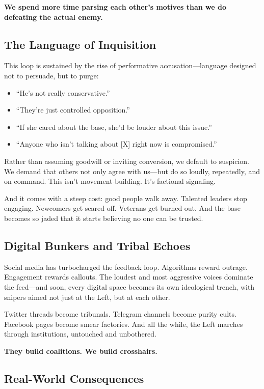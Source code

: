 \textbf{We spend more time parsing each other’s motives than we do defeating the actual enemy.}

\subsection*{The Language of Inquisition}

This loop is sustained by the rise of performative accusation—language designed not to persuade, but to purge:
\begin{itemize}
    \item ``He’s not really conservative.''
    \item ``They’re just controlled opposition.''
    \item ``If she cared about the base, she’d be louder about this issue.''
    \item ``Anyone who isn’t talking about [X] right now is compromised.''
\end{itemize}

Rather than assuming goodwill or inviting conversion, we default to suspicion. We demand that others not only agree with us—but do so loudly, repeatedly, and on command. This isn’t movement-building. It’s factional signaling.

And it comes with a steep cost: good people walk away. Talented leaders stop engaging. Newcomers get scared off. Veterans get burned out. And the base becomes so jaded that it starts believing no one can be trusted.

\subsection*{Digital Bunkers and Tribal Echoes}

Social media has turbocharged the feedback loop. Algorithms reward outrage. Engagement rewards callouts. The loudest and most aggressive voices dominate the feed—and soon, every digital space becomes its own ideological trench, with snipers aimed not just at the Left, but at each other.

Twitter threads become tribunals. Telegram channels become purity cults. Facebook pages become smear factories. And all the while, the Left marches through institutions, untouched and unbothered.

\textbf{They build coalitions. We build crosshairs.}

\subsection*{Real-World Consequences}

